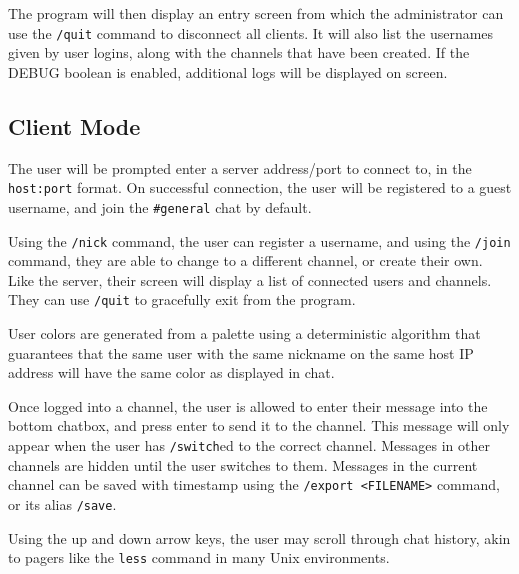 \documentclass{article}
\begin{document}
The program will then display an entry screen from which the administrator can use the \verb|/quit| command to disconnect all clients. It will also list the usernames given by user logins, along with the channels that have been created. If the DEBUG boolean is enabled, additional logs will be displayed on screen.

\subsection{Client Mode}
The user will be prompted enter a server address/port to connect to, in the \verb|host:port| format. On successful connection, the user will be registered to a guest username, and join the \verb|#general| chat by default.

Using the \verb|/nick| command, the user can register a username, and using the \verb|/join| command, they are able to change to a different channel, or create their own. Like the server, their screen will display a list of connected users and channels. They can use \verb|/quit| to gracefully exit from the program.

User colors are generated from a palette using a deterministic algorithm that guarantees that the same user with the same nickname on the same host IP address will have the same color as displayed in chat.

Once logged into a channel, the user is allowed to enter their message into the bottom chatbox, and press enter to send it to the channel. This message will only appear when the user has \verb|/switch|ed to the correct channel. Messages in other channels are hidden until the user switches to them.
Messages in the current channel can be saved with timestamp using the \verb|/export <FILENAME>| command, or its alias \verb|/save|.

Using the up and down arrow keys, the user may scroll through chat history, akin to pagers like the \verb|less| command in many Unix environments.
\end{document}
